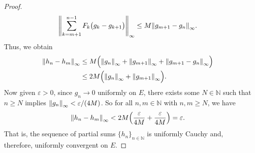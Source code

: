 \documentclass[12pt]{article}
\theoremstyle{definition}
\newcommand{\N}{\mathbb{N}}
\newcommand{\eps}{\varepsilon}
\newcommand{\supnorm}[1]{\norm{#1}_{\infty}}
\begin{document}
\begin{proof}
    \[
        \supnorm{\sum_{k=m+1}^{n-1} F_k\qty\big(g_k - g_{k+1})} \leq M\supnorm{g_{m+1} - g_n}.
    \]
    Thus, we obtain
    \begin{align*}
        \supnorm{h_n - h_m}
            &\leq M \qty\Big(\supnorm{g_n} + \supnorm{g_{m+1}} +\supnorm{g_{m+1} - g_n}) \\
            &\leq 2M \qty\Big(\supnorm{g_n} + \supnorm{g_{m+1}}).
    \end{align*}
    Now given $\eps > 0$, since $g_n \to 0$ uniformly on $E$, there exists some $N \in \N$ such that $n \geq N$ implies $\supnorm{g_n} < \eps/(4M)$. So for all $n, m \in \N$ with $n, m \geq N$, we have
    \[
        \supnorm{h_n - h_m}
            < 2M \qty(\frac{\eps}{4M} + \frac{\eps}{4M})
            = \eps.
    \]
    That is, the sequence of partial sums $\{h_n\}_{n\in\N}$ is uniformly Cauchy and, therefore, uniformly convergent on $E$. 

\end{proof}


\newpage
\end{document}
